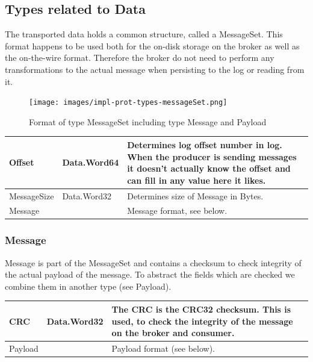 \subsection{Types related to Data}
\label{impl-protocol-types-data}

The transported data holds a common structure,
called a MessageSet. This format happens to be used both for the on-disk storage on the
broker as well as the on-the-wire format. Therefore the broker do not need to perform
any transformations to the actual message when persisting to the log or reading
from it. 

\begin{figure}[H]
    \centering
    \texttt{[image: images/impl-prot-types-messageSet.png]}
    \caption{Format of type MessageSet including type Message and Payload}
    \label{fig:impl-prot-types-messageSet}
\end{figure}

\begin{table}[H]
\centering
\begin{tabular}{ l  l  p{8.5cm} }
\hline
Offset      & Data.Word64 & Determines log offset number in log.  When the producer is sending messages it doesn't actually know the offset and can fill in any value here it likes. \\ \hline
MessageSize & Data.Word32 & Determines size of Message in Bytes.               \\ \hline
Message     &     & Message format, see below.                                                                                                                    \\ \hline
\end{tabular}
\end{table}

\subsubsection{Message}
Message is part of the MessageSet and contains a checksum to check integrity of
the actual payload of the message. To abstract the fields which are checked we
combine them in another type (see Payload).


\begin{table}[H]
\centering
\begin{tabular}{ l  l  p{8.5cm} }
\hline
CRC     & Data.Word32 & The CRC is the CRC32 checksum. This is used, to check the integrity of the message on the broker and consumer. \\ \hline
Payload &      & Payload format (see below).                                                                                                                  \\ \hline
\end{tabular}
\end{table}

